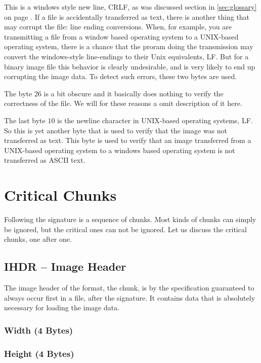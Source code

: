 This is a windows style new line, CRLF, as was discussed section in
\ref{sec:glossary} on page \pageref{sec:glossary}. If a \png file is
accidentally transferred as text, there is another thing that may
corrupt the file: line ending conversions. When, for example, you are
transmitting a file from a window based operating system to a
UNIX-based operating system, there is a chance that the proram doing
the transmission may convert the windows-style line-endings to their
Unix equivalents, LF. But for a binary image file this behavior is
clearly undesirable, and is very likely to end up corrupting the image
data. To detect such errors, these two bytes are used.

The byte $26$ is a bit obscure and it basically does nothing to verify
the correctness of the file. We will for these reasons a omit
description of it here.

The last byte $10$ is the newline character in UNIX-based operating
systems, LF. So this is yet another byte that is used to verify that
the image was not transferred as text. This byte is used to verify
that an image transferred from a UNIX-based operating system to a
windows based operating system is not transferred as ASCII text.

\section{Critical Chunks}

Following the \png signature is a sequence of chunks. Most kinds of
chunks can simply be ignored, but the critical ones can not be
ignored. Let us discuss the critical chunks, one after one.

\subsection{IHDR -- Image Header}

The image header of the \png format, the  chunk, is by the
\png specification guaranteed to always occur first in a \png file,
after the \png signature. It contains data that is absolutely necessary
for loading the image data.

\subsubsection*{Width (4 Bytes)}
\subsubsection*{Height (4 Bytes)}

